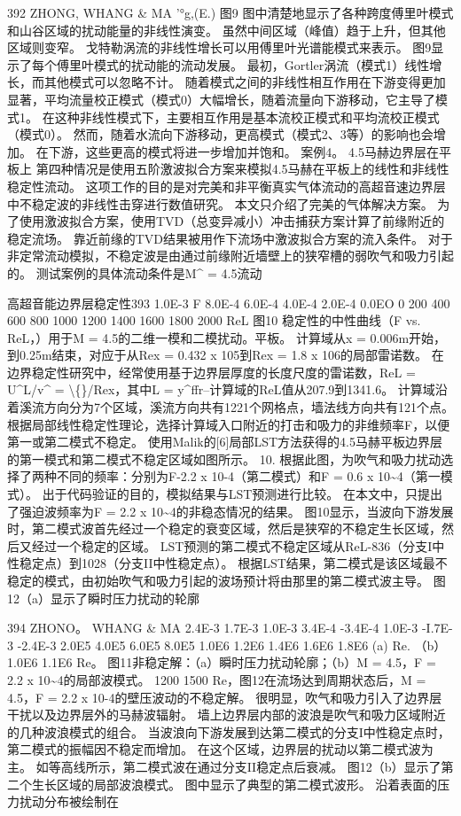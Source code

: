 \documentclass[UTF8,11pt,a4paper,openany,fontset=fandol]{ctexbook}
\begin{document}
392 ZHONG, WHANG \& MA '°g,(E.) 图9 图中清楚地显示了各种跨度傅里叶模式和山谷区域的扰动能量的非线性演变。 虽然中间区域（峰值）趋于上升，但其他区域则变窄。 戈特勒涡流的非线性增长可以用傅里叶光谱能模式来表示。 图9显示了每个傅里叶模式的扰动能的流动发展。 最初，Gortler涡流（模式1）线性增长，而其他模式可以忽略不计。 随着模式之间的非线性相互作用在下游变得更加显著，平均流量校正模式（模式0）大幅增长，随着流量向下游移动，它主导了模式1。 在这种非线性模式下，主要相互作用是基本流校正模式和平均流校正模式（模式0）。 然而，随着水流向下游移动，更高模式（模式2、3等）的影响也会增加。 在下游，这些更高的模式将进一步增加并饱和。 案例4。 4.5马赫边界层在平板上 第四种情况是使用五阶激波拟合方案来模拟4.5马赫在平板上的线性和非线性稳定性流动。 这项工作的目的是对完美和非平衡真实气体流动的高超音速边界层中不稳定波的非线性击穿进行数值研究。 本文只介绍了完美的气体解决方案。 为了使用激波拟合方案，使用TVD（总变异减小）冲击捕获方案计算了前缘附近的稳定流场。 靠近前缘的TVD结果被用作下流场中激波拟合方案的流入条件。 对于非定常流动模拟，不稳定波是由通过前缘附近墙壁上的狭窄槽的弱吹气和吸力引起的。 测试案例的具体流动条件是M\textasciicircum{} = 4.5流动

高超音能边界层稳定性393 1.0E-3 F 8.0E-4 6.0E-4 4.0E-4 2.0E-4 0.0EO 0 200 400 600 800 1000 1200 1400 1600 1800 2000 ReL 图10 稳定性的中性曲线（F vs. ReL，）用于M = 4.5的二维一模和二模扰动。平板。 计算域从x = 0.006m开始，到0.25m结束，对应于从Rex = 0.432 x 105到Rex = 1.8 x 106的局部雷诺数。 在边界稳定性研究中，经常使用基于边界层厚度的长度尺度的雷诺数，ReL = U\textasciicircum{}L/v\textasciicircum{} = \textbackslash\{\}/Rex，其中L = y\textasciicircum{}ffr--计算域的ReL值从207.9到1341.6。 计算域沿着溪流方向分为7个区域，溪流方向共有1221个网格点，墙法线方向共有121个点。 根据局部线性稳定性理论，选择计算域入口附近的打击和吸力的非维频率F，以便第一或第二模式不稳定。 使用Malik的[6]局部LST方法获得的4.5马赫平板边界层的第一模式和第二模式不稳定区域如图所示。 10. 根据此图，为吹气和吸力扰动选择了两种不同的频率：分别为F-2.2 x 10-4（第二模式）和F = 0.6 x 10\textasciitilde{}4（第一模式）。 出于代码验证的目的，模拟结果与LST预测进行比较。 在本文中，只提出了强迫波频率为F = 2.2 x 10\textasciitilde{}4的非稳态情况的结果。 图10显示，当波向下游发展时，第二模式波首先经过一个稳定的衰变区域，然后是狭窄的不稳定生长区域，然后又经过一个稳定的区域。 LST预测的第二模式不稳定区域从ReL-836（分支I中性稳定点）到1028（分支II中性稳定点）。 根据LST结果，第二模式是该区域最不稳定的模式，由初始吹气和吸力引起的波场预计将由那里的第二模式波主导。 图12（a）显示了瞬时压力扰动的轮廓

394 ZHONO。 WHANG \& MA 2.4E-3 1.7E-3 1.0E-3 3.4E-4 -3.4E-4 1.0E-3 -I.7E-3 -2.4E-3 2.0E5 4.0E5 6.0E5 8.0E5 1.0E6 1.2E6 1.4E6 1.6E6 1.8E6 (a) Re. （b）1.0E6 1.1E6 Re。 图11非稳定解：（a）瞬时压力扰动轮廓；（b）M = 4.5，F = 2.2 x 10\textasciitilde{}4的局部波模式。 1200 1500 Re，图12在流场达到周期状态后，M = 4.5，F = 2.2 x 10-4的壁压波动的不稳定解。 很明显，吹气和吸力引入了边界层干扰以及边界层外的马赫波辐射。 墙上边界层内部的波浪是吹气和吸力区域附近的几种波浪模式的组合。 当波浪向下游发展到达第二模式的分支I中性稳定点时，第二模式的振幅因不稳定而增加。 在这个区域，边界层的扰动以第二模式波为主。 如等高线所示，第二模式波在通过分支II稳定点后衰减。 图12（b）显示了第二个生长区域的局部波浪模式。 图中显示了典型的第二模式波形。 沿着表面的压力扰动分布被绘制在
\end{document}
